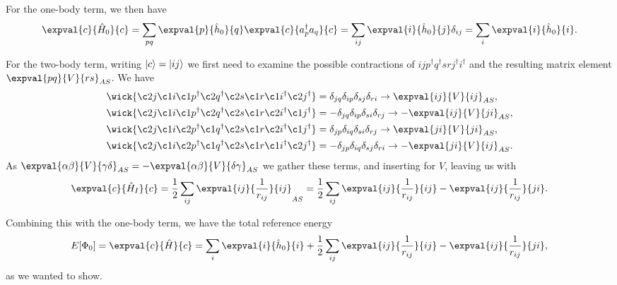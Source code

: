For the one-body term, we then have
\begin{equation}
    \expval{c}{\hat{H}_0}{c} = \sum_{pq} \expval{p}{\hat{h}_0}{q} \expval{c}{a_p^\dagger a_q}{c} = \sum_{ij} \expval{i}{\hat{h}_0}{j} \delta_{ij} = \sum_{i} \expval{i}{\hat{h}_0}{i}.
\end{equation}

For the two-body term, writing $\lvert c\rangle = \lvert i j\rangle$ we first need to examine the possible contractions of $ i j p^\dagger q^\dagger s r j^\dagger i^\dagger$ and the resulting matrix element $\expval{pq}{V}{rs}_{AS}$.
We have
\begin{align*}
    \wick{
        \c2 j
        \c1 i
        \c1 p^\dagger
        \c2 q^\dagger
        \c2 s
        \c1 r
        \c1 i^\dagger
        \c2 j^\dagger
    } &= \delta_{jq} \delta_{ip} \delta_{sj} \delta_{ri} \to \expval{ij}{V}{ij}_{AS}, \\
    \wick{
        \c2 j
        \c1 i
        \c1 p^\dagger
        \c2 q^\dagger
        \c2 s
        \c1 r
        \c2 i^\dagger
        \c1 j^\dagger
    } &= -\delta_{jq} \delta_{ip} \delta_{si} \delta_{rj} \to -\expval{ij}{V}{ji}_{AS}, \\
    \wick{
        \c2 j
        \c1 i
        \c2 p^\dagger
        \c1 q^\dagger
        \c2 s
        \c1 r
        \c2 i^\dagger
        \c1 j^\dagger
    } &= \delta_{jp} \delta_{iq} \delta_{si} \delta_{rj} \to \expval{ji}{V}{ji}_{AS}, \\
    \wick{
        \c2 j
        \c1 i
        \c2 p^\dagger
        \c1 q^\dagger
        \c2 s
        \c1 r
        \c1 i^\dagger
        \c2 j^\dagger
    } &= -\delta_{jp} \delta_{iq} \delta_{sj} \delta_{ri} \to -\expval{ji}{V}{ij}_{AS}.
\end{align*}
As $\expval{\alpha \beta}{V}{\gamma \delta}_{AS} = - \expval{\alpha \beta}{V}{\delta \gamma}_{AS}$ we gather these terms, and inserting for $V$, leaving us with
\begin{equation}
    \expval{c}{\hat{H}_I}{c} = \frac{1}{2} \sum_{ij} \expval{ij}{\frac{1}{r_{ij}}}{ij}_{AS} = \frac{1}{2} \sum_{ij} \expval{ij}{\frac{1}{r_{ij}}}{ij} - \expval{ij}{\frac{1}{r_{ij}}}{ji}.
\end{equation}

Combining this with the one-body term, we have the total reference energy
\begin{equation}
    E[\Phi_0] = \expval{c}{\hat{H}}{c} = \sum_{i} \expval{i}{\hat{h}_0}{i} + \frac{1}{2} \sum_{ij} \expval{ij}{\frac{1}{r_{ij}}}{ij} - \expval{ij}{\frac{1}{r_{ij}}}{ji},
\end{equation}
as we wanted to show.

